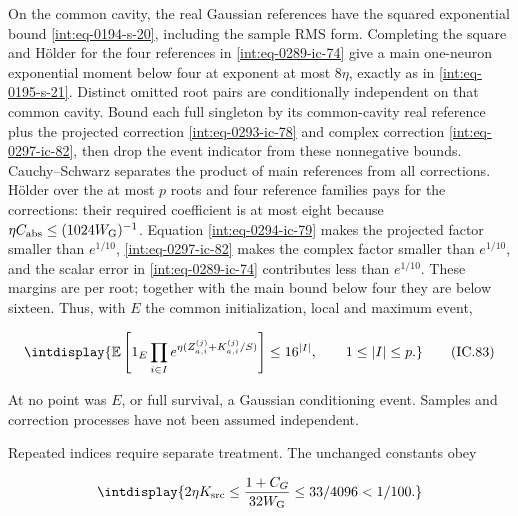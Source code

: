 On the common cavity, the real Gaussian references have the squared exponential bound \eqref{int:eq-0194-s-20}, including the sample RMS form. Completing the square and Hölder for the four references in \eqref{int:eq-0289-ic-74} give a main one-neuron exponential moment below four at exponent at most \(8\eta\), exactly as in \eqref{int:eq-0195-s-21}. Distinct omitted root pairs are conditionally independent on that common cavity. Bound each full singleton by its common-cavity real reference plus the projected correction \eqref{int:eq-0293-ic-78} and complex correction \eqref{int:eq-0297-ic-82}, then drop the event indicator from these nonnegative bounds. Cauchy--Schwarz separates the product of main references from all corrections. Hölder over the at most \(p\) roots and four reference families pays for the corrections: their required coefficient is at most eight because \(\eta C_{\rm abs}\le(1024W_{\rm G})^{-1}\). Equation \eqref{int:eq-0294-ic-79} makes the projected factor smaller than \(e^{1/10}\), \eqref{int:eq-0297-ic-82} makes the complex factor smaller than \(e^{1/10}\), and the scalar error in \eqref{int:eq-0289-ic-74} contributes less than \(e^{1/10}\). These margins are per root; together with the main bound below four they are below sixteen. Thus, with \(E\) the common initialization, local and maximum event,


\begingroup\renewcommand{\theHequation}{intdisplay.680}
\begin{equation}
\intdisplay{
\mathbb E\left[1_E\prod_{i\in I}
 e^{\eta(Z_{a,i}^{(j)}+K_{a,i}^{(j)}/S)}\right]\le16^{|I|},
 \qquad1\le|I|\le p.
}
\tag{IC.83}
\label{int:eq-0298-ic-83}
\end{equation}
\endgroup


At no point was \(E\), or full survival, a Gaussian conditioning event. Samples and correction processes have not been assumed independent.



Repeated indices require separate treatment. The unchanged constants obey


\begingroup\renewcommand{\theHequation}{intdisplay.681}
\begin{equation*}
\intdisplay{
2\eta K_{\rm src}\le\frac{1+C_G}{32W_{\rm G}}
                  \le33/4096<1/100.
}
\end{equation*}
\endgroup


